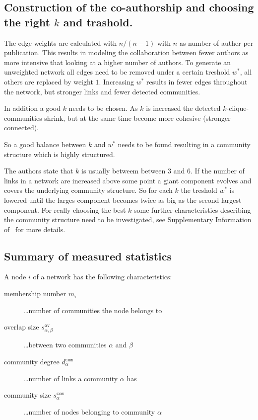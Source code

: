 \documentclass[runningheads,a4paper]{llncs}
\begin{document}
\subsection{Construction of the co-authorship and choosing the right $k$ and trashold.}
\label{cpm-construction}
The edge weights are calculated with $n/(n-1)$ with $n$ as number of auther per publication.
This results in modeling the collaboration between fewer authors as more intensive that looking at a higher number of authors.  
To generate an unweighted network all edges need to be removed under a certain treshold $w^*$, all others are replaced by weight $1$. Increasing $w^*$ results in fewer edges throughout the network, but stronger links and fewer detected communities.

In addition a good $k$ needs to be chosen. As $k$ is increased the detected $k$-clique-communities shrink, but at the same time become more cohesive (stronger connected).

So a good balance between $k$ and $w^*$ needs to be found resulting in a community structure which is highly structured.

The authors state that $k$ is usually betweem between $3$ and $6$.
If the number of links in a network are increased above some point a giant component evolves and covers the underlying community structure.
So for each $k$ the treshold $w^*$ is lowered until the larges component becomes twice as big as the second largest component. For really choosing the best $k$ some further characteristics describing the community structure need to be investigated, see Supplementary Information of~\cite{palla2005uncovering} for more details.

\subsection{Summary of measured statistics}
A node $i$ of a network has the following characteristics:

\begin{description}
	\item[membership number \textbf{$m_i$}] \dots number of communities the node belongs to
	\item[overlap size $s^\texttt{ov}_{\alpha,\beta}$] \dots between two communities $\alpha$ and $\beta$
	\item[community degree $d_{\alpha}^\texttt{com}$] \dots number of links a community $\alpha$ has
	\item[community size $s_{\alpha}^\texttt{com}$] \dots number of nodes belonging to community $\alpha$
\end{description}
\end{document}
